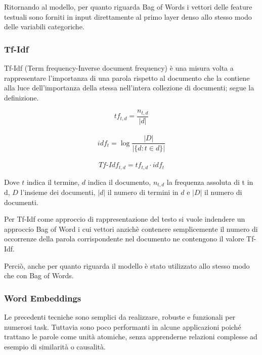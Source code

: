 Ritornando al modello, per quanto riguarda Bag of Words i vettori delle feature
testuali sono forniti in input direttamente al primo layer denso allo stesso
modo delle variabili categoriche.

\subsubsection{Tf-Idf}\label{section-tfidf} Tf-Idf (Term frequency-Inverse
document frequency) \cite{manning_raghavan_schutze_2008} è una misura volta a
rappresentare l'importanza di una parola rispetto al documento che la contiene alla luce
dell'importanza della stessa nell'intera collezione di documenti; segue la
definizione.%

\begin{equation}
\label{eq:tf}
   tf_{t,d} = \frac{n_{t,d}}{|d|} 
\end{equation}
\\
\begin{equation}
\label{eq:idf}
   idf_{t} = \log \frac{|D|}{|\{d: t \in d\}|} 
\end{equation}
\\
\begin{equation}
\label{eq:tf-idf}
    Tf\mbox{-}Idf_{t,d} = tf_{t,d} \cdot idf_t
\end{equation}

Dove $t$ indica il termine, $d$
indica il documento, $n_{t,d}$ la frequenza assoluta di t in d, $D$ l'insieme
dei documenti, $|d|$ il numero di termini in $d$ e $|D|$ il numero di documenti.

Per Tf-Idf come approccio di rappresentazione del testo si vuole indendere un
approccio Bag of Word i cui vettori anzichè contenere semplicemente il numero di
occorrenze della parola corrispondente nel documento ne contengono il valore
Tf-Idf.

Perciò, anche per quanto riguarda il modello è stato utilizzato allo stesso modo
che con Bag of Words. 



\subsubsection{Word Embeddings}

Le precedenti tecniche sono semplici da realizzare, robuste e funzionali per
numerosi task. Tuttavia sono poco performanti in alcune applicazioni poiché
trattano le parole come unità atomiche, senza apprenderne relazioni complesse
ad esempio di similarità o causalità.

